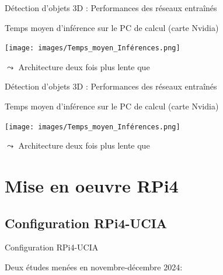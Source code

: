 \documentclass[11pt,serif,mathserif,compress,hyperref={colorlinks}]{beamer}
\begin{document}
\begin{frame}{Détection d'objets 3D : Performances des réseaux entraînés}
 
  \begin{tcolorbox}[add to width=.7cm, title={Temps d'inférence}]
    Temps moyen d'inférence sur le PC de calcul (carte Nvidia)
    
    \texttt{[image: images/Temps\_moyen\_Inférences.png]}

    $\leadsto$ Architecture  deux fois plus lente que 
  \end{tcolorbox}
    
\end{frame}

\begin{frame}{Détection d'objets 3D : Performances des réseaux entraînés}
  
  \begin{tcolorbox}[title={Précision des réseaux entraînés}]
    Temps moyen d'inférence sur le PC de calcul (carte Nvidia)
    
    \texttt{[image: images/Temps\_moyen\_Inférences.png]}

    $\leadsto$ Architecture  deux fois plus lente que 
  \end{tcolorbox}
    
\end{frame}

\section{Mise en oeuvre RPi4}

\subsection{Configuration RPi4-UCIA}

\begin{frame}{Configuration RPi4-UCIA}
  
  \begin{tcolorbox}[add to width=.7cm, title={Études pour le projet UCIA}]
    Deux études menées en novembre-décembre 2024:
    
  \end{tcolorbox}
    
\end{frame}
\end{document}
